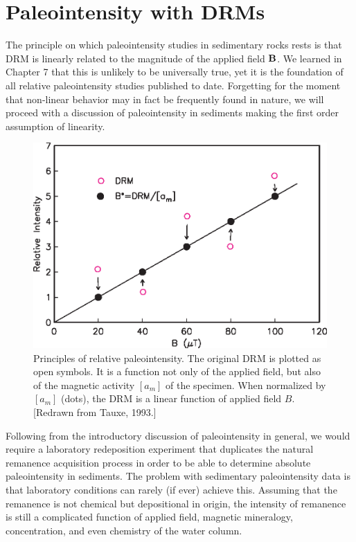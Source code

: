 \section{Paleointensity with DRMs}
\label{sect:drmint}

The principle on which paleointensity studies in sedimentary rocks rests is
that DRM is linearly related to the magnitude of the
applied field $\hbox{\bf B}$.   We learned in Chapter 7  that this is  unlikely to be universally true, yet it is the foundation  of all relative paleointensity studies published to date.  
Forgetting for the moment that non-linear behavior may in fact be frequently found in nature, we will proceed with a discussion of paleointensity in sediments making the first order assumption of linearity.  

\begin{figure}[htb]
\centering  \includegraphics[width=10 cm]{EPSfiles/drm1.eps}
\caption{Principles of relative paleointensity.  The original DRM is plotted
as open symbols.  It is a function not only of the applied field, but
also of the magnetic activity $[a_m]$ of the specimen.  When normalized by
$[a_m]$ (dots), the DRM is a linear function of applied field $B$.  [Redrawn from Tauxe, 1993.] }
\label{fig:drm}
\end{figure}
\nocite{tauxe93}



Following from the introductory discussion of paleointensity in general, we would require a laboratory redeposition experiment that duplicates the natural remanence acquisition process in order to be able to determine absolute paleointensity in  sediments.  
The problem with sedimentary paleointensity data is that laboratory
conditions can rarely (if ever) achieve this.  Assuming that the remanence is not chemical but depositional in origin,
  the intensity of remanence is still a complicated  function
  of applied  field, magnetic mineralogy, concentration,  and even chemistry of the water column.

